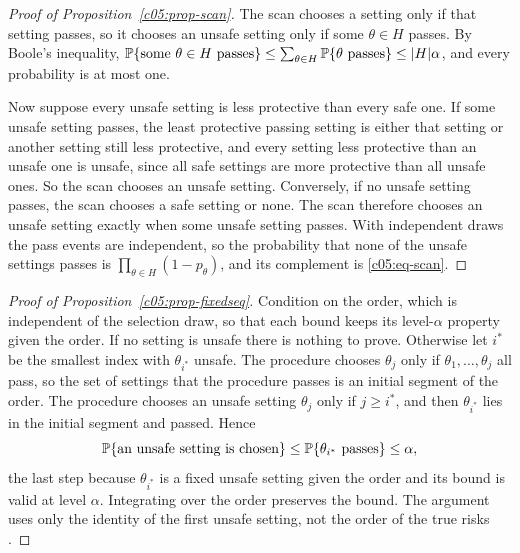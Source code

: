 \begin{proof}[Proof of Proposition~\ref{c05:prop-scan}]
The scan chooses a setting only if that setting passes, so it chooses an unsafe setting
only if some $\theta \in H$ passes. By Boole's inequality,
$\mathbb{P}\{\text{some } \theta \in H \text{ passes}\} \le \sum_{\theta\in H}\mathbb{P}\{\theta
\text{ passes}\} \le |H|\alpha$, and every probability is at most one.

Now suppose every unsafe setting is less protective than every safe one. If some unsafe
setting passes, the least protective passing setting is either that setting or another
setting still less protective, and every setting less protective than an unsafe one is
unsafe, since all safe settings are more protective than all unsafe ones. So the scan
chooses an unsafe setting. Conversely, if no unsafe setting passes, the scan chooses a
safe setting or none. The scan therefore chooses an unsafe setting exactly when some
unsafe setting passes. With independent draws the pass events are independent, so the
probability that none of the unsafe settings passes is $\prod_{\theta\in H}(1-p_\theta)$,
and its complement is \eqref{c05:eq-scan}.
\end{proof}

\begin{proof}[Proof of Proposition~\ref{c05:prop-fixedseq}]
Condition on the order, which is independent of the selection draw, so that each bound
keeps its level-$\alpha$ property given the order. If no setting is unsafe there is
nothing to prove. Otherwise let $i^\ast$ be the smallest index with $\theta_{i^\ast}$
unsafe. The procedure chooses $\theta_j$ only if $\theta_1, \dots, \theta_j$ all pass,
so the set of settings that the procedure passes is an initial segment of the order. The
procedure chooses an unsafe setting $\theta_j$ only if $j \ge i^\ast$, and then
$\theta_{i^\ast}$ lies in the initial segment and passed. Hence
\[
\mathbb{P}\{\text{an unsafe setting is chosen}\} \le
\mathbb{P}\{\theta_{i^\ast}\text{ passes}\} \le \alpha,
\]
the last step because $\theta_{i^\ast}$ is a fixed unsafe setting given the order and its
bound is valid at level $\alpha$. Integrating over the order preserves the bound. The
argument uses only the identity of the first unsafe setting, not the order of the true
risks \citep{maurer1995}.
\end{proof}

